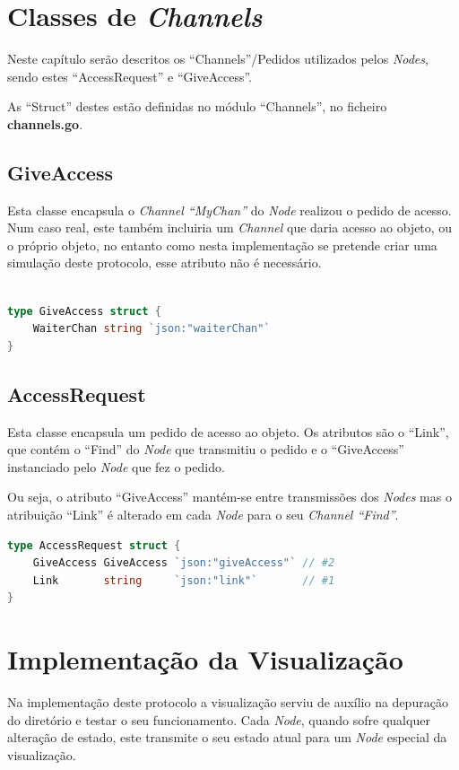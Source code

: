 \section{Classes de \emph{Channels}}
Neste capítulo serão descritos os ``Channels''/Pedidos utilizados pelos \emph{Nodes}, sendo estes ``AccessRequest'' e ``GiveAccess''.

As ``Struct'' destes estão definidas no módulo ``Channels'', no ficheiro \textbf{channels.go}.


\subsection{GiveAccess}
Esta classe encapsula o \emph{Channel ``MyChan''} do \emph{Node} realizou o pedido de acesso.
Num caso real, este também incluiria um \emph{Channel} que daria acesso ao objeto, ou o próprio objeto, no entanto
como nesta implementação se pretende criar uma simulação deste protocolo, esse atributo não é necessário.

\begin{lstlisting}[caption={Método ``UpdateVisualization''},language=Go]

type GiveAccess struct {
	WaiterChan string `json:"waiterChan"`
}

\end{lstlisting}


\subsection{AccessRequest}
Esta classe encapsula um pedido de acesso ao objeto. Os atributos são o ``Link'', que contém o ``Find'' do \emph{Node} que transmitiu o pedido e 
o ``GiveAccess'' instanciado pelo \emph{Node} que fez o pedido.

Ou seja, o atributo ``GiveAccess'' mantém-se entre transmissões dos \emph{Nodes} mas o atribuição ``Link'' é alterado em cada \emph{Node} para o 
seu \emph{Channel ``Find''}.

\begin{lstlisting}[caption={Método ``UpdateVisualization''},language=Go]
type AccessRequest struct {
	GiveAccess GiveAccess `json:"giveAccess"` // #2
	Link       string     `json:"link"`       // #1
}
\end{lstlisting}




\section{Implementação da Visualização}
Na implementação deste protocolo a visualização serviu de auxílio na depuração do diretório e testar o seu funcionamento.
Cada \emph{Node}, quando sofre qualquer alteração de estado, este transmite o seu estado atual para um \emph{Node} especial da visualização.

